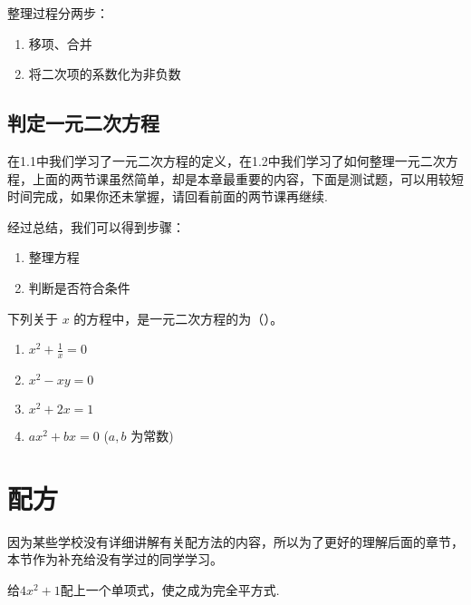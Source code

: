 \documentclass[lang=cn, 10pt, titlestyle=hang]{elegantbook}
\begin{document}
整理过程分两步：
\begin{enumerate}
    \item 移项、合并
    \item 将二次项的系数化为非负数
\end{enumerate}

\subsection{判定一元二次方程}

在1.1中我们学习了一元二次方程的定义，在1.2中我们学习了如何整理一元二次方程，上面的两节课虽然简单，却是本章最重要的内容，下面是测试题，可以用较短时间完成，如果你还未掌握，请回看前面的两节课再继续.



经过总结，我们可以得到步骤：



\begin{enumerate}
    \item 整理方程
    \item 判断是否符合条件
\end{enumerate}


\begin{problemset}[1.1-1.3习题]
    \item 下列关于 \( x \) 的方程中，是一元二次方程的为（{\hspace{3em}}）。
    \begin{enumerate}[label=\Alph*.]
        \item \( x^2 + \frac{1}{x} = 0 \)
        \item \( x^2 - xy = 0 \)
        \item \( x^2 + 2x = 1 \)
        \item \( ax^2 + bx = 0 \) (\( a, b \) 为常数)
    \end{enumerate}
\end{problemset}

\section{配方}



因为某些学校没有详细讲解有关配方法的内容，所以为了更好的理解后面的章节，本节作为补充给没有学过的同学学习。



\begin{example}
    给\( 4x^2 +1\)配上一个单项式，使之成为完全平方式.
\end{example}
\end{document}
